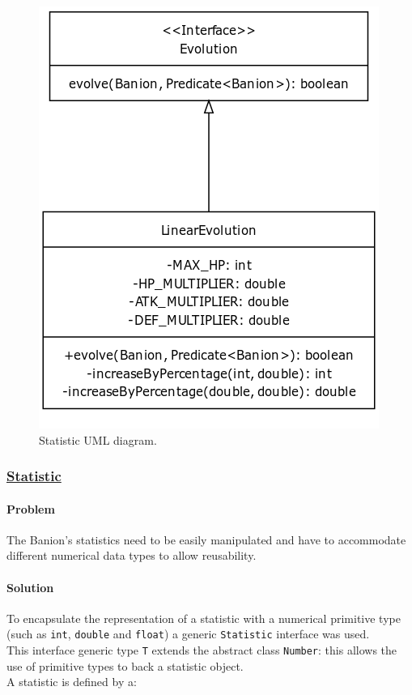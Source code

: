 \documentclass[12pt, a4paper]{report}
\theoremstyle{definition}
\begin{document}
    \begin{figure}[h]
    \centering{}
    \caption{Statistic UML diagram.}
    \includegraphics[scale=0.8]{evolution_uml}
    \end{figure}

    \subsubsection{\underline{Statistic}}
    \paragraph{Problem}
    The Banion's statistics need to be easily manipulated and have to accommodate different numerical data types to allow reusability.
    \paragraph{Solution}
    To encapsulate the representation of a statistic with a numerical primitive type (such as \verb|int|, \verb|double| and \verb|float|)
    a generic \verb|Statistic| interface was used.\\
    This interface generic type \verb|T| extends the abstract class \verb|Number|: this allows the use of primitive types to back a statistic object.\\
    A statistic is defined by a:
\end{document}
